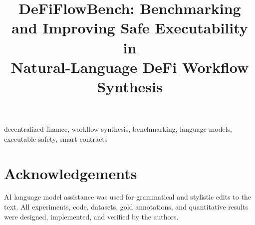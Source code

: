 \documentclass[conference]{IEEEtran}
\title{DeFiFlowBench: Benchmarking and Improving Safe Executability in\\
Natural-Language DeFi Workflow Synthesis}
\author{%
\IEEEauthorblockN{Anonymous Authors}
\IEEEauthorblockA{Paper under review}
}
\begin{document}
\maketitle

\begin{abstract}

\end{abstract}

\begin{IEEEkeywords}
decentralized finance, workflow synthesis, benchmarking, language models,
executable safety, smart contracts
\end{IEEEkeywords}











\section*{Acknowledgements}
AI language model assistance was used for grammatical and stylistic edits
to the text. All experiments, code, datasets, gold annotations, and
quantitative results were designed, implemented, and verified by the
authors.



\end{document}
